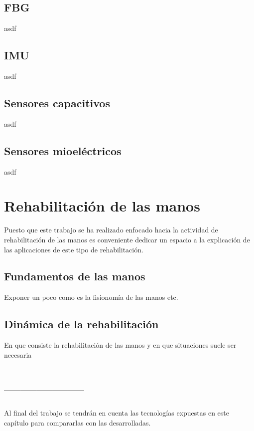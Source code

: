 \subsection{FBG}
\label{sec:fbg2}
asdf

\subsection{IMU}
\label{sec:imu2}
asdf

\subsection{Sensores capacitivos}
\label{sec:capacitivos2}
asdf

\subsection{Sensores mioeléctricos}
\label{sec:mioelectricos2}
asdf


\section{Rehabilitación de las manos}
\label{sec:Rehabilitacion2}
Puesto que este trabajo se ha realizado enfocado hacia la actividad de rehabilitación de las manos es conveniente dedicar un espacio a la explicación de las aplicaciones de este tipo de rehabilitación.\\
\subsection{Fundamentos de las manos}
\label{sec:manos2}
Exponer un poco como es la fisionomía de las manos etc.
\subsection{Dinámica de la rehabilitación}
\label{sec:dinamica2}
En que consiste la rehabilitación de las manos y en que situaciones suele ser necesaria\\



\section{---------------}

Al final del trabajo se tendrán en cuenta las  tecnologías expuestas en este capítulo para compararlas con las desarrolladas.
\cite{citaPruebaMiri}

